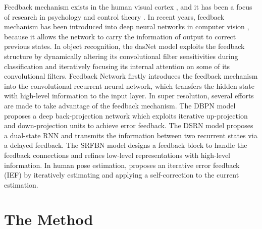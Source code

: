 \documentclass[runningheads]{llncs}
\begin{document}
Feedback mechanism exists in the human visual cortex \cite{hupe1998cortical,gilbert2007brain}, and it has been a focus of research in psychology \cite{ashford1983feedback} and control theory \cite{lee1967foundations,parlos1994application}. In recent years, feedback mechanism has been introduced into deep neural networks in computer vision \cite{stollenga2014deep,zamir2017feedback,li2019feedback,haris2018deep,han2018image,carreira2016human}, because it allows the network to carry the information of output to correct previous states.
In object recognition, the dasNet model \cite{stollenga2014deep} exploits the feedback structure by dynamically altering its convolutional filter sensitivities during classification and iteratively focusing its internal attention on some of its convolutional filters. Feedback Network \cite{zamir2017feedback} firstly introduces the feedback mechanism into the convolutional recurrent neural network, which transfers the hidden state with high-level information to the input layer.
In super resolution, several efforts \cite{li2019feedback,haris2018deep,han2018image} are made to take advantage of the feedback mechanism. The DBPN model \cite{haris2018deep} proposes a deep back-projection network which exploits iterative up-projection and down-projection units to achieve error feedback. The DSRN model \cite{han2018image} proposes a dual-state RNN and transmits the information between two recurrent states via a delayed feedback. The SRFBN model \cite{li2019feedback} designs a feedback block to handle the feedback connections and refines low-level representations with high-level information.
In human pose estimation, \cite{carreira2016human} proposes an iterative error feedback (IEF) by iteratively estimating and applying a self-correction to the current estimation.

\vspace{-1mm}
\section{The Method}
\vspace{-1mm}
\end{document}
